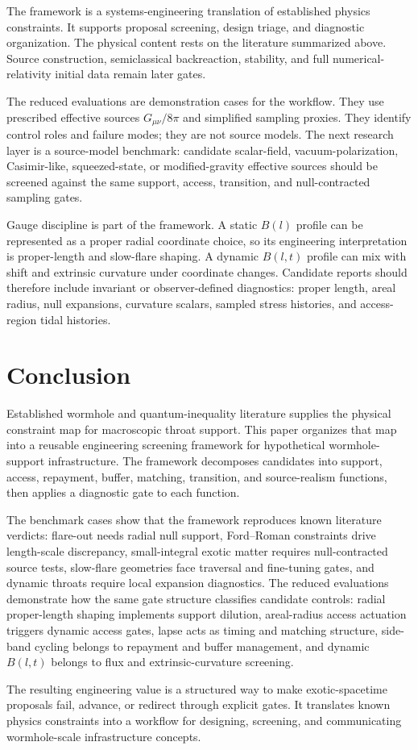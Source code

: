 \documentclass[11pt]{article}
\begin{document}
The framework is a systems-engineering translation of established physics constraints.  It supports proposal screening, design triage, and diagnostic organization.  The physical content rests on the literature summarized above.  Source construction, semiclassical backreaction, stability, and full numerical-relativity initial data remain later gates.

The reduced evaluations are demonstration cases for the workflow.  They use prescribed effective sources $G_{\mu\nu}/8\pi$ and simplified sampling proxies.  They identify control roles and failure modes; they are not source models.  The next research layer is a source-model benchmark: candidate scalar-field, vacuum-polarization, Casimir-like, squeezed-state, or modified-gravity effective sources should be screened against the same support, access, transition, and null-contracted sampling gates.

Gauge discipline is part of the framework.  A static $B(l)$ profile can be represented as a proper radial coordinate choice, so its engineering interpretation is proper-length and slow-flare shaping.  A dynamic $B(l,t)$ profile can mix with shift and extrinsic curvature under coordinate changes.  Candidate reports should therefore include invariant or observer-defined diagnostics: proper length, areal radius, null expansions, curvature scalars, sampled stress histories, and access-region tidal histories.

\section{Conclusion}

Established wormhole and quantum-inequality literature supplies the physical constraint map for macroscopic throat support.  This paper organizes that map into a reusable engineering screening framework for hypothetical wormhole-support infrastructure.  The framework decomposes candidates into support, access, repayment, buffer, matching, transition, and source-realism functions, then applies a diagnostic gate to each function.

The benchmark cases show that the framework reproduces known literature verdicts: flare-out needs radial null support, Ford--Roman constraints drive length-scale discrepancy, small-integral exotic matter requires null-contracted source tests, slow-flare geometries face traversal and fine-tuning gates, and dynamic throats require local expansion diagnostics.  The reduced evaluations demonstrate how the same gate structure classifies candidate controls: radial proper-length shaping implements support dilution, areal-radius access actuation triggers dynamic access gates, lapse acts as timing and matching structure, side-band cycling belongs to repayment and buffer management, and dynamic $B(l,t)$ belongs to flux and extrinsic-curvature screening.

The resulting engineering value is a structured way to make exotic-spacetime proposals fail, advance, or redirect through explicit gates.  It translates known physics constraints into a workflow for designing, screening, and communicating wormhole-scale infrastructure concepts.



\end{document}
